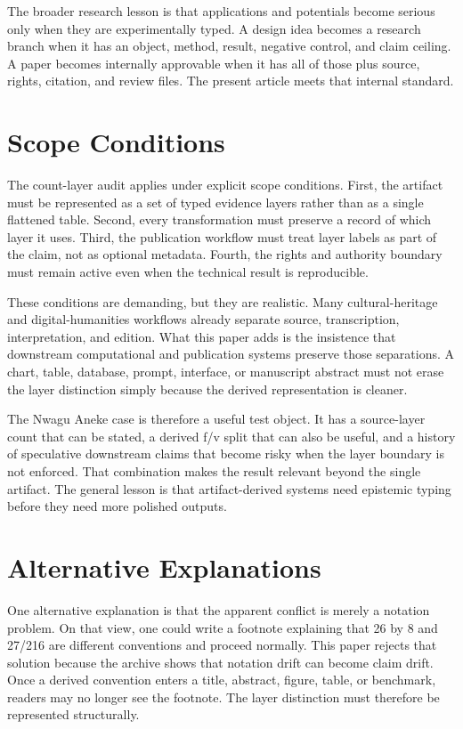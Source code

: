 \documentclass[sigconf,nonacm]{acmart}
\begin{document}
The broader research lesson is that applications and potentials become serious
only when they are experimentally typed. A design idea becomes a research branch
when it has an object, method, result, negative control, and claim ceiling. A
paper becomes internally approvable when it has all of those plus source, rights,
citation, and review files. The present article meets that internal standard.


\section{Scope Conditions}
The count-layer audit applies under explicit scope conditions. First, the artifact must be
represented as a set of typed evidence layers rather than as a single flattened
table. Second, every transformation must preserve a record of which layer it
uses. Third, the publication workflow must treat layer labels as part of the
claim, not as optional metadata. Fourth, the rights and authority boundary must
remain active even when the technical result is reproducible.

These conditions are demanding, but they are realistic. Many cultural-heritage
and digital-humanities workflows already separate source, transcription,
interpretation, and edition. What this paper adds is the insistence that
downstream computational and publication systems preserve those separations. A
chart, table, database, prompt, interface, or manuscript abstract must not erase
the layer distinction simply because the derived representation is cleaner.

The Nwagu Aneke case is therefore a useful test object. It has a source-layer
count that can be stated, a derived f/v split that can also be useful, and a
history of speculative downstream claims that become risky when the layer
boundary is not enforced. That combination makes the result relevant beyond the
single artifact. The general lesson is that artifact-derived systems need
epistemic typing before they need more polished outputs.

\section{Alternative Explanations}
One alternative explanation is that the apparent conflict is merely a notation
problem. On that view, one could write a footnote explaining that 26 by 8 and
27/216 are different conventions and proceed normally. This paper rejects that
solution because the archive shows that notation drift can become claim drift.
Once a derived convention enters a title, abstract, figure, table, or benchmark,
readers may no longer see the footnote. The layer distinction must therefore be
represented structurally.
\end{document}

